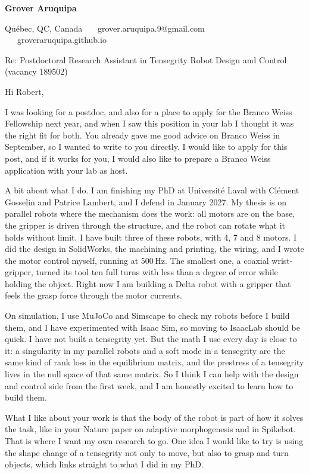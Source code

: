 \documentclass[11pt,a4paper]{article}
\begin{document}
{\large\bfseries Grover Aruquipa}\par\vspace{-5pt}
{\small Qu\'ebec, QC, Canada \ \textbullet\ \ grover.aruquipa.9@gmail.com \ \textbullet\ \ groveraruquipa.github.io}

\vspace{2pt}
Re: Postdoctoral Research Assistant in Tensegrity Robot Design and Control (vacancy 189502)

Hi Robert,

I was looking for a postdoc, and also for a place to apply for the Branco Weiss Fellowship next year, and when I saw this position in your lab I thought it was the right fit for both. You already gave me good advice on Branco Weiss in September, so I wanted to write to you directly. I would like to apply for this post, and if it works for you, I would also like to prepare a Branco Weiss application with your lab as host.

A bit about what I do. I am finishing my PhD at Universit\'e Laval with Cl\'ement Gosselin and Patrice Lambert, and I defend in January 2027. My thesis is on parallel robots where the mechanism does the work: all motors are on the base, the gripper is driven through the structure, and the robot can rotate what it holds without limit. I have built three of these robots, with 4, 7 and 8 motors. I did the design in SolidWorks, the machining and printing, the wiring, and I wrote the motor control myself, running at 500\,Hz. The smallest one, a coaxial wrist-gripper, turned its tool ten full turns with less than a degree of error while holding the object. Right now I am building a Delta robot with a gripper that feels the grasp force through the motor currents.

On simulation, I use MuJoCo and Simscape to check my robots before I build them, and I have experimented with Isaac Sim, so moving to IsaacLab should be quick. I have not built a tensegrity yet. But the math I use every day is close to it: a singularity in my parallel robots and a soft mode in a tensegrity are the same kind of rank loss in the equilibrium matrix, and the prestress of a tensegrity lives in the null space of that same matrix. So I think I can help with the design and control side from the first week, and I am honestly excited to learn how to build them.

What I like about your work is that the body of the robot is part of how it solves the task, like in your Nature paper on adaptive morphogenesis and in Spikebot. That is where I want my own research to go. One idea I would like to try is using the shape change of a tensegrity not only to move, but also to grasp and turn objects, which links straight to what I did in my PhD.
\end{document}
